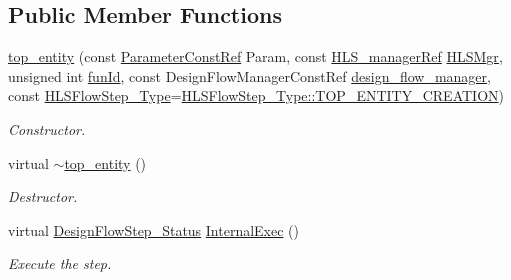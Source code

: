 \subsection*{Public Member Functions}
\begin{DoxyCompactItemize}
\item 
\hyperlink{classtop__entity_adc1d91ea0660baba3b103fbe053b0d30}{top\+\_\+entity} (const \hyperlink{Parameter_8hpp_a37841774a6fcb479b597fdf8955eb4ea}{Parameter\+Const\+Ref} Param, const \hyperlink{hls__manager_8hpp_acd3842b8589fe52c08fc0b2fcc813bfe}{H\+L\+S\+\_\+manager\+Ref} \hyperlink{classHLS__step_ade85003a99d34134418451ddc46a18e9}{H\+L\+S\+Mgr}, unsigned int \hyperlink{classHLSFunctionStep_a3e6434fd86c698b0c70520b859bff5b0}{fun\+Id}, const Design\+Flow\+Manager\+Const\+Ref \hyperlink{classDesignFlowStep_ab770677ddf087613add30024e16a5554}{design\+\_\+flow\+\_\+manager}, const \hyperlink{hls__step_8hpp_ada16bc22905016180e26fc7e39537f8d}{H\+L\+S\+Flow\+Step\+\_\+\+Type}=\hyperlink{hls__step_8hpp_ada16bc22905016180e26fc7e39537f8da7ad3d91f561dccd4c3beff4860b7f848}{H\+L\+S\+Flow\+Step\+\_\+\+Type\+::\+T\+O\+P\+\_\+\+E\+N\+T\+I\+T\+Y\+\_\+\+C\+R\+E\+A\+T\+I\+ON})
\begin{DoxyCompactList}\small\item\em Constructor. \end{DoxyCompactList}\item 
virtual \hyperlink{classtop__entity_a5a61bc3f8b01888887203ce9408eaddf}{$\sim$top\+\_\+entity} ()
\begin{DoxyCompactList}\small\item\em Destructor. \end{DoxyCompactList}\item 
virtual \hyperlink{design__flow__step_8hpp_afb1f0d73069c26076b8d31dbc8ebecdf}{Design\+Flow\+Step\+\_\+\+Status} \hyperlink{classtop__entity_ae3b1c2be3024a1f3abfe3066d8db12fb}{Internal\+Exec} ()
\begin{DoxyCompactList}\small\item\em Execute the step. \end{DoxyCompactList}\end{DoxyCompactItemize}
